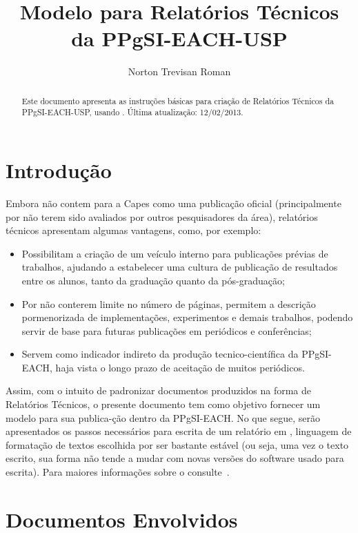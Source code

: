 \documentclass[12pt,a4paper,utf8]{ppgsi}
\title{Modelo para Relatórios Técnicos da PPgSI-EACH-USP}
\author{Norton Trevisan Roman\inst{1}}
\begin{document}
\maketitle

\begin{abstract}
	Este documento apresenta as instruções básicas para criação de Relatórios Técnicos da PPgSI-EACH-USP, usando \LaTeXe. Última atualização: 12/02/2013.
\end{abstract}

\section{Introdução}

	Embora não contem para a Capes como uma publicação oficial (principalmente por não terem sido avaliados por outros pesquisadores da área), relatórios técnicos apresentam algumas vantagens, como, por exemplo:

	\begin{itemize}
		\item Possibilitam a criação de um veículo interno para publicações prévias de trabalhos, ajudando a estabelecer uma cultura de publicação de resultados entre os alunos, tanto da graduação quanto da pós-graduação;
		\item Por não conterem limite no número de páginas, permitem a descrição pormenorizada de implementações, experimentos e demais trabalhos, podendo servir de base para futuras publicações em periódicos e conferências;
		\item Servem como indicador indireto da produção tecnico-científica da PPgSI-EACH, haja vista o longo prazo de aceitação de muitos periódicos.
	\end{itemize}

	Assim, com o intuito de padronizar documentos produzidos na forma de Relatórios Técnicos, o presente documento tem como objetivo fornecer um modelo para sua publica-ção dentro da PPgSI-EACH. No que segue, serão apresentados os passos necessários para escrita de um relatório em \LaTeXe, linguagem de formatação de textos escolhida por ser bastante estável (ou seja, uma vez o texto escrito, sua forma não tende a mudar com novas versões do software usado para escrita). Para maiores informações sobre o \LaTeXe{} consulte~\citep{lamport1994,Mittelbach2004}.


\section{Documentos Envolvidos}
\end{document}
